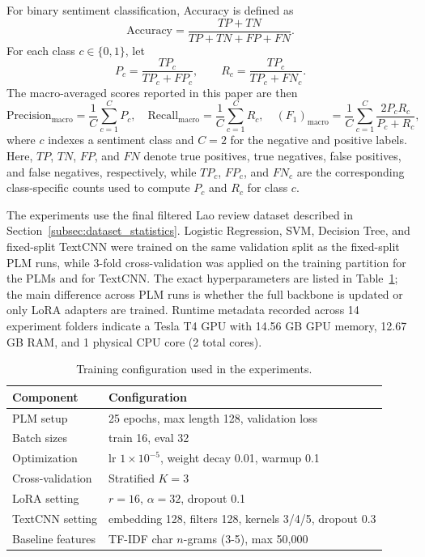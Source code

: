 \documentclass[conference, onecolumn]{IEEEtran}
\begin{document}
For binary sentiment classification, Accuracy is defined as
\begin{equation}
\mathrm{Accuracy} = \frac{TP + TN}{TP + TN + FP + FN}.
\end{equation}
For each class $c \in \{0,1\}$, let
\begin{equation}
P_c = \frac{TP_c}{TP_c + FP_c}, \qquad R_c = \frac{TP_c}{TP_c + FN_c}.
\end{equation}
The macro-averaged scores reported in this paper are then
\begin{equation}
\mathrm{Precision}_{\mathrm{macro}} = \frac{1}{C}\sum_{c=1}^{C} P_c,\quad
\mathrm{Recall}_{\mathrm{macro}} = \frac{1}{C}\sum_{c=1}^{C} R_c,\quad
(F_1)_{\mathrm{macro}} = \frac{1}{C}\sum_{c=1}^{C} \frac{2P_cR_c}{P_c + R_c},
\end{equation}
where $c$ indexes a sentiment class and $C=2$ for the negative and positive labels. Here, $TP$, $TN$, $FP$, and $FN$ denote true positives, true negatives, false positives, and false negatives, respectively, while $TP_c$, $FP_c$, and $FN_c$ are the corresponding class-specific counts used to compute $P_c$ and $R_c$ for class $c$.

The experiments use the final filtered Lao review dataset described in Section~\ref{subsec:dataset_statistics}. Logistic Regression, SVM, Decision Tree, and fixed-split TextCNN were trained on the same validation split as the fixed-split PLM runs, while 3-fold cross-validation was applied on the training partition for the PLMs and for TextCNN. The exact hyperparameters are listed in Table~\ref{tab:training_config}; the main difference across PLM runs is whether the full backbone is updated or only LoRA adapters are trained. Runtime metadata recorded across 14 experiment folders indicate a Tesla T4 GPU with 14.56 GB GPU memory, 12.67 GB RAM, and 1 physical CPU core (2 total cores).

\begin{table}[!htbp]
\centering
\caption{Training configuration used in the experiments.}
\small
\begin{tabular}{@{}p{}p{}@{}}
\toprule
\textbf{Component} & \textbf{Configuration} \\
\midrule
PLM setup & 25 epochs, max length 128, validation loss \\
Batch sizes & train 16, eval 32 \\
Optimization & lr $1 \times 10^{-5}$, weight decay 0.01, warmup 0.1 \\
Cross-validation & Stratified $K=3$ \\
LoRA setting & $r=16$, $\alpha=32$, dropout 0.1 \\
TextCNN setting & embedding 128, filters 128, kernels 3/4/5, dropout 0.3 \\
Baseline features & TF-IDF char $n$-grams (3-5), max 50,000 \\
\bottomrule
\end{tabular}
\label{tab:training_config}
\end{table}
\end{document}
